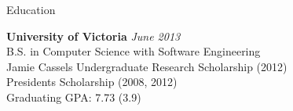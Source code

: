 \documentclass{resume} %
\begin{document}

\begin{rSection}{Education}

{\bf University of Victoria} \hfill {\em June 2013} \\ 
B.S. in Computer Science with Software Engineering \\
Jamie Cassels Undergraduate Research Scholarship (2012) \\
Presidents Scholarship (2008, 2012) \\
Graduating GPA: 7.73 (3.9)

\end{rSection}

\end{document}
